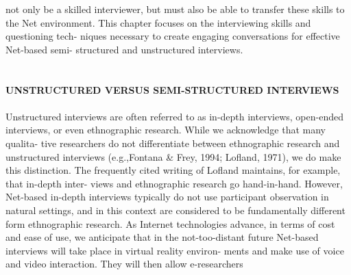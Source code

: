 \documentclass{book}
\begin{document}
not only be a skilled interviewer, but must also be able to transfer these skills to the Net
environment. This chapter focuses on the interviewing skills and questioning tech-
niques necessary to create engaging conversations for effective Net-based semi-
structured and unstructured interviews. \\
\\
\vspace*{0.3cm}
\\
\textbf{UNSTRUCTURED VERSUS SEMI-STRUCTURED INTERVIEWS}
\\
\vspace*{0.3cm}
\\
Unstructured interviews are often referred to as in-depth interviews, open-ended
interviews, or even ethnographic research. While we acknowledge that many qualita-
tive researchers do not differentiate between ethnographic research and unstructured
interviews (e.g.,Fontana & Frey, 1994; Lofland, 1971), we do make this distinction.
The frequently cited writing of Lofland maintains, for example, that in-depth inter-
views and ethnographic research go hand-in-hand. However, Net-based in-depth
interviews typically do not use participant observation in natural settings, and in this
context are considered to be fundamentally different form ethnographic research. As
Internet technologies advance, in terms of cost and ease of use, we anticipate that in the
not-too-distant future Net-based interviews will take place in virtual reality environ-
ments and make use of voice and video interaction. They will then allow e-researchers
\end{document}
